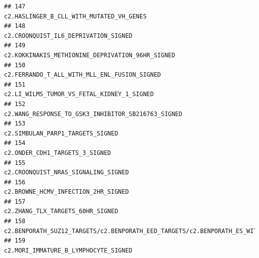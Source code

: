 \documentclass{article}\usepackage[]{graphicx}\usepackage[]{color}
\makeatletter
\newenvironment{kframe}{%
 \def\at@end@of@kframe{}%
 \ifinner\ifhmode%
  \def\at@end@of@kframe{\end{minipage}}%
  \begin{minipage}{\columnwidth}%
 \fi\fi%
 \def\FrameCommand##1{\hskip\@totalleftmargin \hskip-\fboxsep
 \colorbox{shadecolor}{##1}\hskip-\fboxsep
     \hskip-\linewidth \hskip-\@totalleftmargin \hskip\columnwidth}%
 \MakeFramed {\advance\hsize-\width
   \@totalleftmargin\z@ \linewidth\hsize
   \@setminipage}}%
 {\par\unskip\endMakeFramed%
 \at@end@of@kframe}
\newenvironment{knitrout}{}{} %
\makeatother
\begin{document}
\begin{knitrout}
\begin{kframe}
\begin{verbatim}
## 147                                                                                                                                                                         c2.HASLINGER_B_CLL_WITH_MUTATED_VH_GENES
## 148                                                                                                                                                                             c2.CROONQUIST_IL6_DEPRIVATION_SIGNED
## 149                                                                                                                                                                 c2.KOKKINAKIS_METHIONINE_DEPRIVATION_96HR_SIGNED
## 150                                                                                                                                                                     c2.FERRANDO_T_ALL_WITH_MLL_ENL_FUSION_SIGNED
## 151                                                                                                                                                                       c2.LI_WILMS_TUMOR_VS_FETAL_KIDNEY_1_SIGNED
## 152                                                                                                                                                               c2.WANG_RESPONSE_TO_GSK3_INHIBITOR_SB216763_SIGNED
## 153                                                                                                                                                                                 c2.SIMBULAN_PARP1_TARGETS_SIGNED
## 154                                                                                                                                                                                   c2.ONDER_CDH1_TARGETS_3_SIGNED
## 155                                                                                                                                                                              c2.CROONQUIST_NRAS_SIGNALING_SIGNED
## 156                                                                                                                                                                              c2.BROWNE_HCMV_INFECTION_2HR_SIGNED
## 157                                                                                                                                                                                 c2.ZHANG_TLX_TARGETS_60HR_SIGNED
## 158                                                                                                      c2.BENPORATH_SUZ12_TARGETS/c2.BENPORATH_EED_TARGETS/c2.BENPORATH_ES_WITH_H3K27ME3/c2.BENPORATH_PRC2_TARGETS
## 159                                                                                                                                                                             c2.MORI_IMMATURE_B_LYMPHOCYTE_SIGNED

\end{verbatim}
\end{kframe}
\end{knitrout}
\end{document}
